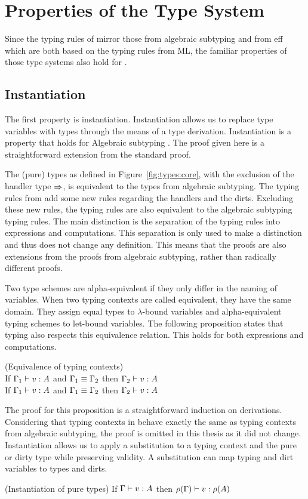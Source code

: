 \section{Properties of the Type System}
Since the typing rules of \core mirror those from algebraic subtyping and from eff which are both based on the typing rules from ML, the familiar properties of those type systems also hold for \core. 

\subsection{Instantiation}
The first property is instantiation. Instantiation allows us to replace type variables with types through the means of a type derivation. Instantiation is a property that holds for Algebraic subtyping \cite{dolan2017algebraic}. The proof given here is a straightforward extension from the standard proof.

The (pure) types as defined in Figure~\ref{fig:types:core}, with the exclusion of the handler type $\Rightarrow$, is equivalent to the types from algebraic subtyping. The typing rules from \core add some new rules regarding the handlers and the dirts. Excluding these new rules, the typing rules are also equivalent to the algebraic subtyping typing rules. The main distinction is the separation of the typing rules into expressions and computations. This separation is only used to make a distinction and thus does not change any definition. This means that the proofs are also extensions from the proofs from algebraic subtyping, rather than radically different proofs. 

Two type schemes are alpha-equivalent if they only differ in the naming of variables. When two typing contexts are called equivalent, they have the same domain. They assign equal types to $\lambda$-bound variables and alpha-equivalent typing schemes to let-bound variables. The following proposition states that typing also respects this equivalence relation. This holds for both expressions and computations. 
\begin{prop}
\label{prop:equiv:env}
(Equivalence of typing contexts) \\
If $\Gamma_1 \vdash v \mathrel{:} A$ and $\Gamma_1 \equiv \Gamma_2$ then $\Gamma_2 \vdash v \mathrel{:} A$ \\
If $\Gamma_1 \vdash v \mathrel{:} A$ and $\Gamma_1 \equiv \Gamma_2$ then $\Gamma_2 \vdash v \mathrel{:} A$
\end{prop}
The proof for this proposition is a straightforward induction on derivations. Considering that typing contexts in \core behave exactly the same as typing contexts from algebraic subtyping, the proof is omitted in this thesis as it did not change. Instantiation allows us to apply a substitution to a typing context and the pure or dirty type while preserving validity. A substitution can map typing and dirt variables to types and dirts. 
\begin{theorem}
\label{thm:instantiation:pure}
(Instantiation of pure types) If $\Gamma \vdash v \mathrel{:} A$ then $\rho(\Gamma) \vdash v \mathrel{:} \rho(A)$
\end{theorem}

